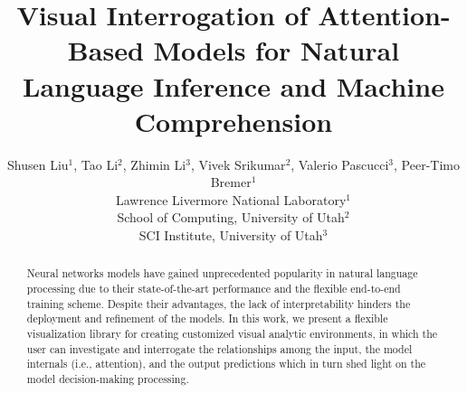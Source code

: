 \documentclass[11pt,a4paper]{article}
\title{Visual Interrogation of Attention-Based Models for Natural Language Inference and Machine Comprehension}
\author{Shusen Liu$^{1}$, Tao Li$^{2}$,  Zhimin Li$^{3}$,  Vivek Srikumar$^{2}$, Valerio Pascucci$^{3}$, Peer-Timo Bremer$^{1}$ \\
  Lawrence Livermore National Laboratory$^{1}$\\
  School of Computing, University of Utah$^{2}$\\  
  SCI Institute, University of Utah$^{3}$\\
}
\begin{document}
\maketitle


\begin{abstract}
Neural networks models have gained unprecedented popularity in natural language processing due to their state-of-the-art performance and the flexible end-to-end training scheme. Despite their advantages, the lack of interpretability hinders the deployment and refinement of the models. In this work, we present a flexible visualization library for creating customized visual analytic environments, in which the user can investigate and interrogate the relationships among the input, the model internals (i.e., attention), and the output predictions which in turn shed light on the model decision-making processing.
\end{abstract}










\end{document}
